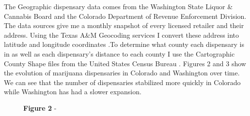 \documentclass[11pt]{article}
\begin{document}
The Geographic dispensary data comes from the Washington State Liquor \& Cannabis Board and the Colorado Department of Revenue Enforcement Division. The data sources give me a monthly snapshot of every licensed retailer and their address. Using the Texas A\&M Geocoding services I convert these address into latitude and longitude coordinates \cite{tamu}.To determine what county each dispensary is in as well as each dispensary's distance to each county I use the Cartographic County Shape files from the United States Census Bureau \cite{branch_2018}. Figures 2 and 3 show the evolution of marijuana dispensaries in Colorado and Washington over time. We can see that the number of dispensaries stabilized more quickly in Colorado while Washington has had a slower expansion. \par


\begin{figure}[H]
	\centering
		\LARGE{\textbf{Figure 2}}
\newline
-
\end{figure}
\end{document}
